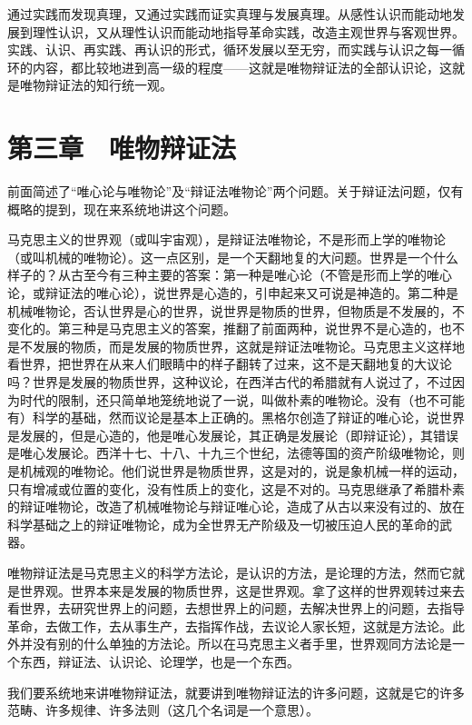 通过实践而发现真理，又通过实践而证实真理与发展真理。从感性认识而能动地发展到理性认识，又从理性认识而能动地指导革命实践，改造主观世界与客观世界。实践、认识、再实践、再认识的形式，循环发展以至无穷，而实践与认识之每一循环的内容，都比较地进到高一级的程度——这就是唯物辩证法的全部认识论，这就是唯物辩证法的知行统一观。

\section{第三章　唯物辩证法}

前面简述了“唯心论与唯物论”及“辩证法唯物论”两个问题。关于辩证法问题，仅有概略的提到，现在来系统地讲这个问题。

马克思主义的世界观（或叫宇宙观），是辩证法唯物论，不是形而上学的唯物论（或叫机械的唯物论）。这一点区别，是一个天翻地复的大问题。世界是一个什么样子的？从古至今有三种主要的答案：第一种是唯心论（不管是形而上学的唯心论，或辩证法的唯心论），说世界是心造的，引申起来又可说是神造的。第二种是机械唯物论，否认世界是心的世界，说世界是物质的世界，但物质是不发展的，不变化的。第三种是马克思主义的答案，推翻了前面两种，说世界不是心造的，也不是不发展的物质，而是发展的物质世界，这就是辩证法唯物论。马克思主义这样地看世界，把世界在从来人们眼睛中的样子翻转了过来，这不是天翻地复的大议论吗？世界是发展的物质世界，这种议论，在西洋古代的希腊就有人说过了，不过因为时代的限制，还只简单地笼统地说了一说，叫做朴素的唯物论。没有（也不可能有）科学的基础，然而议论是基本上正确的。黑格尔创造了辩证的唯心论，说世界是发展的，但是心造的，他是唯心发展论，其正确是发展论（即辩证论），其错误是唯心发展论。西洋十七、十八、十九三个世纪，法德等国的资产阶级唯物论，则是机械观的唯物论。他们说世界是物质世界，这是对的，说是象机械一样的运动，只有增减或位置的变化，没有性质上的变化，这是不对的。马克思继承了希腊朴素的辩证唯物论，改造了机械唯物论与辩证唯心论，造成了从古以来没有过的、放在科学基础之上的辩证唯物论，成为全世界无产阶级及一切被压迫人民的革命的武器。

唯物辩证法是马克思主义的科学方法论，是认识的方法，是论理的方法，然而它就是世界观。世界本来是发展的物质世界，这是世界观。拿了这样的世界观转过来去看世界，去研究世界上的问题，去想世界上的问题，去解决世界上的问题，去指导革命，去做工作，去从事生产，去指挥作战，去议论人家长短，这就是方法论。此外并没有别的什么单独的方法论。所以在马克思主义者手里，世界观同方法论是一个东西，辩证法、认识论、论理学，也是一个东西。

我们要系统地来讲唯物辩证法，就要讲到唯物辩证法的许多问题，这就是它的许多范畴、许多规律、许多法则（这几个名词是一个意思）。

